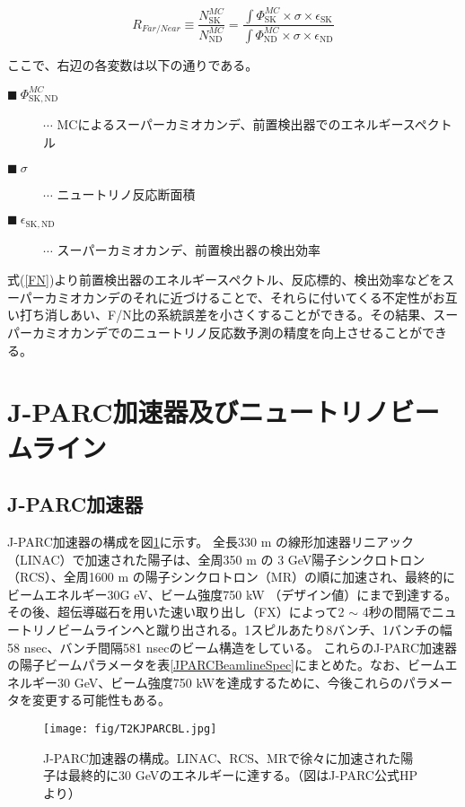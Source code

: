 \documentclass[11pt]{ltjsreport}
\newcommand{\figref}[1]{図\ref{#1}}
\newcommand{\tabref}[1]{表\ref{#1}}
\newcommand{\equref}[1]{式(\ref{#1})}
\newcommand{\nd}{\mathrm{ND}}
\newcommand{\sk}{\mathrm{SK}}
\begin{document}
\begin{equation}
R_{Far/Near} \equiv \frac{N_{\sk}^{MC}}{N_{\nd}^{MC}} = \frac{\int \Phi_{\sk}^{MC} \times \sigma \times \epsilon_{\sk}}{\int \Phi_{\nd}^{MC} \times \sigma \times \epsilon_{\nd}}
\label{FN}
\end{equation}

ここで、右辺の各変数は以下の通りである。
\begin{description}
\item [$\blacksquare\ \Phi_{\sk, \nd}^{MC}$] $\cdots$ MCによるスーパーカミオカンデ、前置検出器でのエネルギースペクトル
\item [$\blacksquare\ \sigma$] $\cdots$ ニュートリノ反応断面積
\item [$\blacksquare\ \epsilon_{\sk, \nd}$] $\cdots$ スーパーカミオカンデ、前置検出器の検出効率
\end{description}

\equref{FN}より前置検出器のエネルギースペクトル、反応標的、検出効率などをスーパーカミオカンデのそれに近づけることで、それらに付いてくる不定性がお互い打ち消しあい、F/N比の系統誤差を小さくすることができる。その結果、スーパーカミオカンデでのニュートリノ反応数予測の精度を向上させることができる。



\section{J-PARC加速器及びニュートリノビームライン}

\subsection{J-PARC加速器}
J-PARC加速器の構成を\figref{JPARC}に示す。
全長330 m の線形加速器リニアック（LINAC）で加速された陽子は、全周350 m の 3 GeV陽子シンクロトロン（RCS）、全周1600 m の陽子シンクロトロン（MR）の順に加速され、最終的にビームエネルギー30G eV、ビーム強度750 kW （デザイン値）にまで到達する。
その後、超伝導磁石を用いた速い取り出し（FX）によって2 $\sim$ 4秒の間隔でニュートリノビームラインへと蹴り出される。1スピルあたり8バンチ、1バンチの幅58 nsec、バンチ間隔581 nsecのビーム構造をしている。
これらのJ-PARC加速器の陽子ビームパラメータを\tabref{JPARCBeamlineSpec}にまとめた。なお、ビームエネルギー30 GeV、ビーム強度750 kWを達成するために、今後これらのパラメータを変更する可能性もある。

\begin{figure}[htbp]
\centering
\texttt{[image: fig/T2KJPARCBL.jpg]}
\caption[J-PARC加速器の構成]{J-PARC加速器の構成。LINAC、RCS、MRで徐々に加速された陽子は最終的に30 GeVのエネルギーに達する。（図はJ-PARC公式HPより）}
\label{JPARC}
\end{figure}
\end{document}
